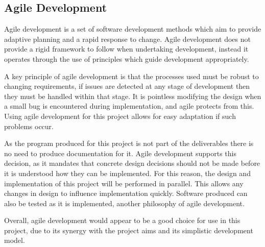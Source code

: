 \subsection{Agile Development}

Agile development \cite{agile_manifesto} is a set of software development methods which aim to provide adaptive planning and a rapid response to change. Agile development does not provide a rigid framework to follow when undertaking development, instead it operates through the use of principles which guide development appropriately. 

A key principle of agile development is that the processes used must be robust to changing requirements, if issues are detected at any stage of development then they must be handled within that stage. It is pointless modifying the design when a small bug is encountered during implementation, and agile protects from this. Using agile development for this project allows for easy adaptation if such problems occur. 

As the program produced for this project is not part of the deliverables there is no need to produce documentation for it. Agile development supports this decision, as it mandates that concrete design decisions should not be made before it is understood how they can be implemented. For this reason, the design and implementation of this project will be performed in parallel. This allows any changes in design to influence implementation quickly. Software produced can also be tested as it is implemented, another philosophy of agile development.

Overall, agile development would appear to be a good choice for use in this project, due to its synergy with the project aims and its simplistic development model.